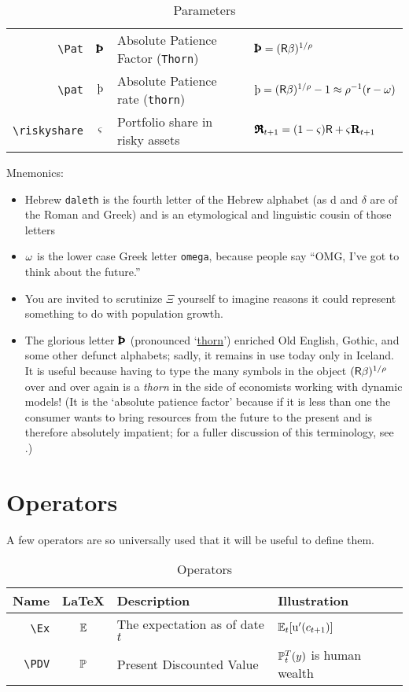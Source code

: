 \documentclass[12pt]{econtex}
\begin{document}
\begin{table}[h]
\begin{tabular}{|>{\ttfamily}rcll|}
  \\ \verb|\Pat|  & $\Pat$ & Absolute Patience Factor (\texttt{Thorn}) & $\Pat = (\Rfree \DiscFac)^{1/\CRRA} $
  \\ \verb|\pat|  & $\pat$ & Absolute Patience rate (\texttt{thorn}) & $\pat = (\Rfree \DiscFac)^{1/\CRRA}-1 \approx \CRRA^{-1}(\rfree-\discRte) $
  \\ \verb|\riskyshare|  & $\varsigma$ & Portfolio share in risky assets & $\pmb{\mathfrak{R}}_{t+1}=(1-\varsigma)\mathsf{R}+\varsigma\mathbf{R}_{t+1}$
  \\	\hline
	\end{tabular}
	\caption{Parameters}
	\label{table:Parameters}
\end{table}	

Mnemonics:
\begin{itemize}
\item Hebrew \texttt{daleth} is the fourth letter of the Hebrew alphabet (as d and $\delta$ are of the Roman and Greek) and is an etymological and linguistic cousin of those letters
\item $\omega$ is the lower case Greek letter \texttt{omega}, because people say ``OMG, I've got to think about the future.''
\item You are invited to scrutinize $\Xi$ yourself to imagine reasons it could represent something to do with population growth.  
\item The glorious letter $\Pat$ (pronounced `\href{http://en.wikipedia.org/wiki/Thorn_(letter)}{thorn}') enriched Old English, Gothic, and some other defunct alphabets; sadly, it remains in use today only in Iceland.  It is useful because having to type the many symbols in the object $(\mathsf{R} \beta)^{1/\rho}$ over and over again is a {\it thorn} in the side of economists working with dynamic models!  (It is the `absolute patience factor' because if it is less than one the consumer wants to bring resources from the future to the present and is therefore absolutely impatient; for a fuller discussion of this terminology, see \cite{carrollTractable}.)
\end{itemize}



\section{Operators}
A few operators are so universally used that it will be useful to define them.

\begin{table}[h]
	\centering
	\begin{tabular}{|>{\ttfamily}rcll|} 		
		\hline
		 Name    & \LaTeX         & Description & Illustration
  \\ \hline
     \verb|\Ex|        & $\operatorname{\mathbb{E}}$       & The expectation as of date $t$ & $\operatorname{\mathbb{E}}_{t}[{\mathrm{u}}^{\prime}(c_{t+1})]$
\\   \verb|\PDV|        & $\mathbb{P}$       & Present Discounted Value & $\mathbb{P}_{t}^{T}(y)$ is human wealth
  \\	\hline
	\end{tabular}
	\caption{Operators}
	\label{table:Operators}
\end{table}	
\end{document}
